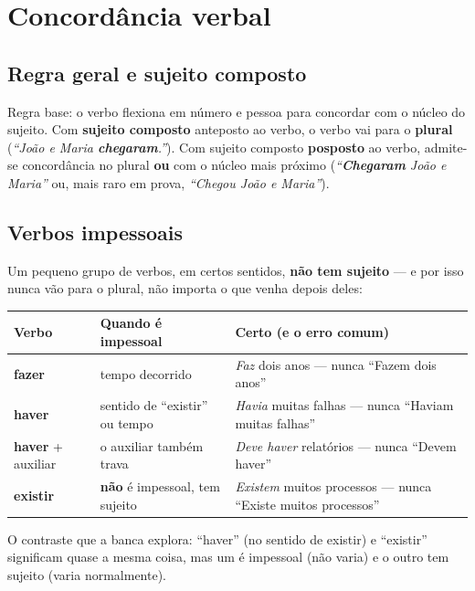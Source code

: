 \section{Concordância verbal}

\subsection{Regra geral e sujeito composto}

\begin{conceito}
Regra base: o verbo flexiona em número e pessoa para concordar com o núcleo
do sujeito. Com \textbf{sujeito composto} anteposto ao verbo, o verbo vai
para o \textbf{plural} (\textit{“João e Maria \textbf{chegaram}.”}). Com
sujeito composto \textbf{posposto} ao verbo, admite-se concordância no plural
\textbf{ou} com o núcleo mais próximo (\textit{“\textbf{Chegaram}
João e Maria”} ou, mais raro em prova, \textit{“Chegou João e Maria”}).
\end{conceito}

\subsection{Verbos impessoais}

\begin{conceito}
Um pequeno grupo de verbos, em certos sentidos, \textbf{não tem sujeito}
--- e por isso nunca vão para o plural, não importa o que venha depois deles:

\begin{center}
\begin{tabular}{@{}p{2.6cm}p{3.6cm}p{5.2cm}@{}}
\toprule
\textbf{Verbo} & \textbf{Quando é impessoal} & \textbf{Certo (e o erro comum)} \\
\midrule
\textbf{fazer} & tempo decorrido & \textit{Faz} dois anos --- nunca “Fazem dois anos” \\
\textbf{haver} & sentido de “existir” ou tempo & \textit{Havia} muitas falhas --- nunca “Haviam muitas falhas” \\
\textbf{haver} + auxiliar & o auxiliar também trava & \textit{Deve haver} relatórios --- nunca “Devem haver” \\
\textbf{existir} & \textbf{não} é impessoal, tem sujeito & \textit{Existem} muitos processos --- nunca “Existe muitos processos” \\
\bottomrule
\end{tabular}
\end{center}

O contraste que a banca explora: “haver” (no sentido de existir) e “existir”
significam quase a mesma coisa, mas um é impessoal (não varia) e o outro tem
sujeito (varia normalmente).
\end{conceito}

